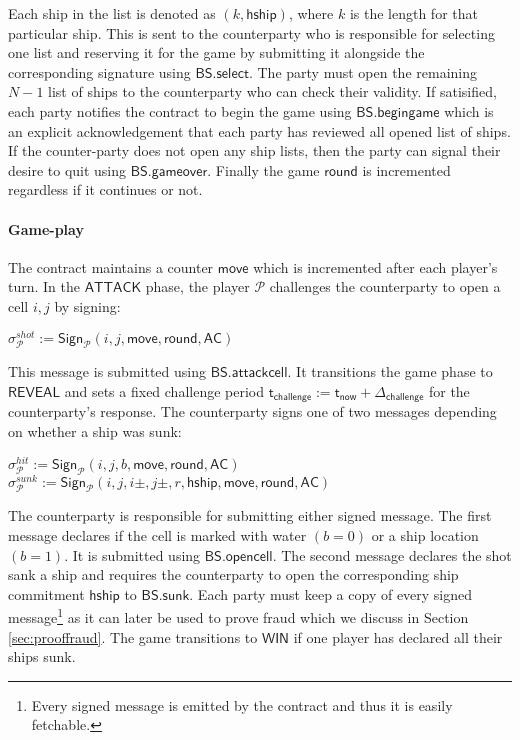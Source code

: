 \documentclass{llncs}
\newcommand{\gameattack}{\mathsf{ATTACK}}
\newcommand{\gamereveal}{\mathsf{REVEAL}}
\newcommand{\gamewinner}{\mathsf{WIN}}
\newcommand{\hship}{\mathsf{hship}}
\newcommand{\participant}{\mathcal{P}}
\newcommand{\sign}{\mathsf{Sign}}
\newcommand{\battleshipattackcell}{\mathsf{BS.attackcell}}
\newcommand{\battleshipbegin}{\mathsf{BS.begingame}}
\newcommand{\battleshipselectboard}{\mathsf{BS.select}}
\newcommand{\battleshiprevealcell}{\mathsf{BS.opencell}}
\newcommand{\battleshipsinking}{\mathsf{BS.sunk}}
\newcommand{\battleshipgameover}{\mathsf{BS.gameover}}
\newcommand{\appcontract}{\mathsf{AC}}
\newcommand{\timerchallenge}{\mathsf{\Delta}_{\mathsf{challenge}}}
\newcommand{\timechallenge}{\mathsf{t}_{\mathsf{challenge}}}
\newcommand{\timenow}{\mathsf{t}_{\mathsf{now}}}
\begin{document}
Each ship in the list is denoted as $(k,\hship)$, where $k$ is the length for that particular ship.  
This is sent to the counterparty who is responsible for selecting one list and reserving it for the game by submitting it alongside the corresponding signature using $\battleshipselectboard$. 
The party must open the remaining $N-1$ list of ships to the counterparty who can check their validity. 
If satisified, each party notifies the contract to begin the game using $\battleshipbegin$ which is an explicit acknowledgement that each party has reviewed all opened list of ships.
If the counter-party does not open any ship lists, then the party can signal their desire to quit  using $\battleshipgameover$.
Finally the game $\mathsf{round}$ is incremented regardless if it continues or not. 

\paragraph{Game-play} \label{sec:gameplayships}
The contract maintains a counter $\mathsf{move}$ which is incremented after each player's turn. 
In the $\gameattack$ phase, the player $\participant$ challenges the counterparty to open a cell $i,j$ by signing: 

\begin{center}
	$\sigma^{shot}_{\participant} := \sign_{\participant}(i,j, \mathsf{move}, \mathsf{round},\appcontract)$ \\
\end{center}

This message is submitted using $\battleshipattackcell$.
It transitions the game phase to $\gamereveal$ and sets a fixed challenge period $\timechallenge := \timenow + \timerchallenge$ for the counterparty's response. 
The counterparty signs one of two messages depending on whether a ship was sunk:

\begin{center}
	$\sigma^{hit}_{\participant} := \sign_{\participant}(i,j,b,\mathsf{move}, \mathsf{round},\appcontract)$ \\ $\sigma^{sunk}_{\participant} := \sign_{\participant}(i,j,i\pm,j\pm,r,\hship,\mathsf{move}, \mathsf{round},\appcontract)$
\end{center}

The counterparty is responsible for submitting either signed message. 
The first message declares if the cell is marked with water $(b=0)$ or a ship location $(b=1)$.
It is submitted using $\battleshiprevealcell$.
The second message declares the shot sank a ship and requires the counterparty to open the corresponding ship commitment $\hship$ to $\battleshipsinking$. 
Each party must keep a copy of every signed message\footnote{Every signed message is emitted by the contract and thus it is easily fetchable.} as it can later be used to prove fraud which we discuss in Section \ref{sec:prooffraud}.
The game transitions to $\gamewinner$ if one player has declared all their ships sunk. 
\end{document}
